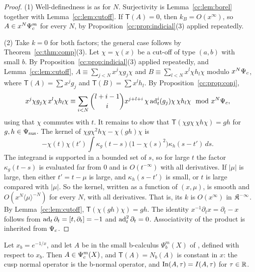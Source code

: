 \begin{proof}
(1) Well-definedness is as for \(N\). Surjectivity is
Lemma~\ref{cc:lem:borel} together with Lemma~\ref{cc:lem:cutoff}. If
\(\mathsf T(A)=0\), then \(k_B=O(x^\infty)\), so \(A\in x^N\Psi_{c}^m\) for
every \(N\), by Proposition~\ref{cc:prop:indicial}(3) applied repeatedly.

(2) Take \(k=0\) for both factors; the general case follows by
Theorem~\ref{cc:thm:comp}(3). Let \(\chi=\chi(x)\) be a cut-off of type
\((a,b)\) with small \(b\). By Proposition~\ref{cc:prop:indicial}(3)
applied repeatedly, and Lemma~\ref{cc:lem:cutoff},
\(A\equiv\sum_{j<N}x^j\chi g_j\chi\) and \(B\equiv\sum_{l<N}x^l\chi
h_l\chi\) modulo \(x^N\Psi_{c}\), where \(\mathsf T(A)=\sum x^jg_j\) and
\(\mathsf T(B)=\sum x^lh_l\). By Proposition~\ref{cc:prop:conj},
\[
 x^j\chi g_j\chi\,x^l\chi h_l\chi\equiv\sum_{i<N}\binom{l+i-1}{i}
 x^{j+l+i}\,\chi\operatorname{ad}_t^i(g_j)\chi\,\chi h_l\chi \mod x^N\Psi_{c} ,
\]
using that \(\chi\) commutes with \(t\). It remains to show that
\(\mathsf T(\chi g\chi\,\chi h\chi)=gh\) for \(g,h\in\Psi_{\mathrm{sus}}\). The kernel of
\(\chi g\chi^2h\chi-\chi(gh)\chi\) is
\[
 -\chi(t)\chi(t')\int\kappa_g(t-s)\bigl(1-\chi(s)^2\bigr)\kappa_h(s-t')\,
 ds .
\]
The integrand is supported in a bounded set of \(s\), so for large
\(t\) the factor \(\kappa_g(t-s)\) is evaluated far from \(0\) and is
\(O(t^{-\infty})\) with all derivatives. If \(|\mu|\) is large, then
either \(t'=t-\mu\) is large, and \(\kappa_h(s-t')\) is small, or \(t\) is
large compared with \(|\mu|\). So the kernel, written as a function of
\((x,\mu)\), is smooth and \(O(x^N\langle\mu\rangle^{-N})\) for every
\(N\), with all derivatives. That is, its \(k\) is \(O(x^\infty)\) in
\(\mathfrak K^{-\infty}\). By Lemma~\ref{cc:lem:cutoff},
\(\mathsf T(\chi(gh)\chi)=gh\). The identity \(x^{-1}\partial_tx=
\partial_t-x\) follows from \(\operatorname{ad}_t\partial_t=[t,\partial_t]=-1\) and
\(\operatorname{ad}_t^2\partial_t=0\). Associativity of the product is inherited from
\(\Psi_{c}\).
\end{proof}

\begin{proposition}
\label{cc:prop:transcendental}
Let \(x_b=e^{-1/x}\), and let \(A\) be in the small b-calculus
\(\Psi_b^m(X)\) of \cite{Notes}, defined with respect to \(x_b\). Then
\(A\in\Psi_{c}^m(X)\), and \(\mathsf T(A)=N_b(A)\) is constant in \(x\):
the cusp normal operator is the b-normal operator, and
\(\operatorname{In}(A,\tau)=I(A,\tau)\) for \(\tau\in\mathbb R\).
\end{proposition}

